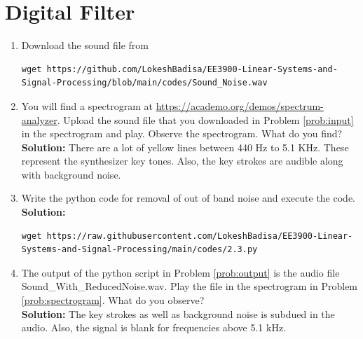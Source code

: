 \documentclass[journal,12pt,twocolumn]{IEEEtran}
\newcommand{\solution}{\noindent \textbf{Solution: }}
\numberwithin{equation}{section}
\renewcommand\thesection{\arabic{section}}
\begin{document}
\section{Digital Filter}
\begin{enumerate}[label=\thesection.\arabic*
,ref=\thesection.\theenumi]
\item
\label{prob:input}
Download the sound file from  
\begin{lstlisting}
wget https://github.com/LokeshBadisa/EE3900-Linear-Systems-and-Signal-Processing/blob/main/codes/Sound_Noise.wav
\end{lstlisting}
\item
\label{prob:spectrogram}
You will find a spectrogram at \href{https://academo.org/demos/spectrum-analyzer}{\url{https://academo.org/demos/spectrum-analyzer}}. 
%
Upload the sound file that you downloaded in Problem \ref{prob:input} in the spectrogram  and play.  Observe the spectrogram. What do you find?
\\
%
\solution There are a lot of yellow lines between 440 Hz to 5.1 KHz.  These represent the synthesizer key tones. Also, the key strokes
are audible along with background noise.
\item
\label{prob:output}
Write the python code for removal of out of band noise and execute the code.
\\
\solution
\begin{lstlisting}
wget https://raw.githubusercontent.com/LokeshBadisa/EE3900-Linear-Systems-and-Signal-Processing/main/codes/2.3.py
\end{lstlisting}

\item
The output of the python script in Problem \ref{prob:output} is the audio file Sound\_With\_ReducedNoise.wav. Play the file in the spectrogram in Problem \ref{prob:spectrogram}. What do you observe?
\\
\solution The key strokes as well as background noise is subdued in the audio.  Also,  the signal is blank for frequencies above 5.1 kHz.

\end{enumerate}
\end{document}
